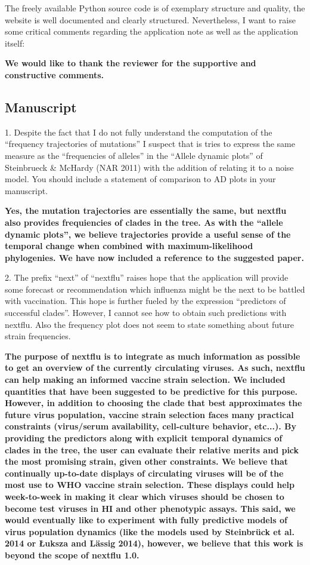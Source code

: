 \documentclass[11pt,oneside,letterpaper]{article}
\begin{document}
The freely available Python source code is of exemplary structure and quality, the website is well documented and clearly structured. Nevertheless, I want to raise some critical comments regarding the application note as well as the application itself:

{\bf We would like to thank the reviewer for the supportive and constructive comments.}

\subsection*{Manuscript}

1. Despite the fact that I do not fully understand the computation of the ``frequency trajectories of mutations'' I suspect that is tries to express the same measure as the ``frequencies of alleles'' in the ``Allele dynamic plots'' of Steinbrueck \& McHardy (NAR 2011) with the addition of relating it to a noise model. You should include a statement of comparison to AD  plots in your manuscript.

{\bf Yes, the mutation trajectories are essentially the same, but nextflu also provides frequiencies of clades in the tree. As with the ``allele dynamic plots'', we believe trajectories provide a useful sense of the temporal change when combined with maximum-likelihood phylogenies. We have now included a reference to the suggested paper.}

2. The prefix ``next'' of ``nextflu'' raises hope that the application will provide some forecast or recommendation which influenza might be the next to be battled with vaccination. This hope is further fueled by the expression ``predictors of successful clades''. However, I cannot see how to obtain such predictions with nextflu. Also the frequency plot does not seem to state something about future strain frequencies.

{\bf The purpose of nextflu is to integrate as much information as possible to get an overview of the currently circulating viruses. As such, nextflu can help making an informed vaccine strain selection. We included quantities that have been suggested to be predictive for this purpose. However, in addition to choosing the clade that best approximates the future virus population, vaccine strain selection faces many practical constraints (virus/serum availability, cell-culture behavior, etc...). By providing the predictors along with explicit temporal dynamics of clades in the tree, the user can evaluate their relative merits and pick the most promising strain, given other constraints. We believe that continually up-to-date displays of circulating viruses will be of the most use to WHO vaccine strain selection. These displays could help week-to-week in making it clear which viruses should be chosen to become test viruses in HI and other phenotypic assays. This said, we would eventually like to experiment with fully predictive models of virus population dynamics (like the models used by Steinbr\"{u}ck et al. 2014 or \L{}uksza and L\"{a}ssig 2014), however, we believe that this work is beyond the scope of nextflu 1.0.}
\end{document}
